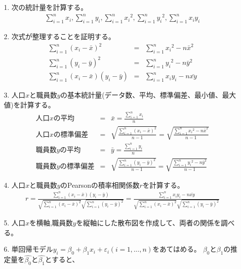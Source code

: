 \documentclass[12pt]{jarticle}
\begin{document}
\begin{itemize}
    \item [1.]次の統計量を計算する。
          \begin{eqnarray}
              \sum_{i=1}^{n} x_i,　\sum_{i=1}^{n} y_i,　\sum_{i=1}^{n} {x_i}^2,　\sum_{i=1}^{n} {y_i}^2,　\sum_{i=1}^{n} x_iy_i \nonumber
          \end{eqnarray}
    \item [2.]次式が整理することを証明する。
          \begin{eqnarray}
              \sum_{i=1}^{n} (x_i-\bar{x})^2&=&\sum_{i=1}^{n} {x_i}^2-n\bar{x}^2 \\
              \sum_{i=1}^{n} (y_i-\bar{y})^2&=&\sum_{i=1}^{n} {y_i}^2-n\bar{y}^2 \\
              \sum_{i=1}^{n} (x_i-\bar{x})(y_i-\bar{y})&=&\sum_{i=1}^{n} {x_iy_i}-n\bar{xy}
          \end{eqnarray}
    \item [3.]人口$x$と職員数$y$の基本統計量(データ数、平均、標準偏差、最小値、最大値)を計算する。
          \begin{eqnarray}
              人口xの平均&=&\bar{x}=\frac{\sum_{i=1}^{n} x_i}{n} \nonumber\\
              人口xの標準偏差&=&\sqrt{\frac{\sum_{i=1}^{n} (x_i-\bar{x})^2}{n-1}}=\sqrt{\frac{\sum_{i=1}^{n} {x_i}^2-n\bar{x}^2}{n-1}} \nonumber\\
              職員数yの平均&=&\bar{y}=\frac{\sum_{i=1}^{n} y_i}{n} \nonumber\\
              職員数yの標準偏差&=&\sqrt{\frac{\sum_{i=1}^{n} (y_i-\bar{y})^2}{n-1}}=\sqrt{\frac{\sum_{i=1}^{n} {y_i}^2-n\bar{y}^2}{n-1}} \nonumber
          \end{eqnarray}
    \item [4.]人口$x$と職員数$y$のPearsonの積率相関係数$r$を計算する。
          \begin{eqnarray}
              r=\frac{\sum_{i=1}^{n} (x_i-\bar{x})(y_i-\bar{y})}{\sqrt{\sum_{i=1}^{n} (x_i-\bar{x})^2} \sqrt{\sum_{i=1}^{n} (y_i-\bar{y})^2}}=\frac{\sum_{i=1}^{n} {x_iy_i}-n\bar{xy}}{\sqrt{\sum_{i=1}^{n} (x_i-\bar{x})^2} \sqrt{\sum_{i=1}^{n} (y_i-\bar{y})^2}}
          \end{eqnarray}
    \item [5.]人口$x$を横軸,職員数$y$を縦軸にした散布図を作成して、両者の関係を調べる。
    \item [6.]単回帰モデル$y_i=\beta_0+\beta_1 x_i + \varepsilon_i(i=1,...,n)$をあてはめる。
          $\beta_0$と$\beta_1$の推定量を$\hat{\beta_0}$と$\hat{\beta_1}$とすると、

\end{itemize}
\end{document}
